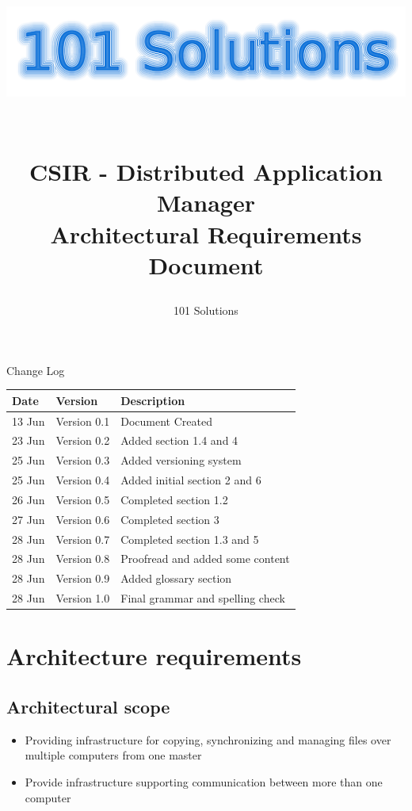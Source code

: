\documentclass[a4paper,12pt,final]{article}
\title{
\begin{center}
  	\includegraphics[scale=0.3]{101Logo.png} 
  \end{center}
  \textbf{\\}
CSIR - Distributed Application Manager\\
Architectural Requirements Document\\
}
\author{101 Solutions}
\begin{document}
\maketitle
\thispagestyle{empty}
\newpage
\tableofcontents
\thispagestyle{empty}
\newpage
Change Log
\vspace{6pt}\newline
\begin{tabular}{|l|l|l|}
\hline
Date & Version & Description\\
\hline
13 Jun & Version 0.1 & Document Created\\
\hline
23 Jun & Version 0.2 & Added section 1.4 and 4\\
\hline
25 Jun & Version 0.3 & Added versioning system\\
\hline
25 Jun & Version 0.4 & Added initial section 2 and 6\\
\hline
26 Jun & Version 0.5 & Completed section 1.2\\
\hline
27 Jun & Version 0.6 & Completed section 3\\
\hline
28 Jun & Version 0.7 & Completed section 1.3 and 5\\
\hline
28 Jun & Version 0.8 & Proofread and added some content\\
\hline
28 Jun & Version 0.9 & Added glossary section\\
\hline
28 Jun & Version 1.0 & Final grammar and spelling check\\
\hline
\end{tabular}

\section{Architecture requirements}
\subsection{Architectural scope}
\begin{itemize}
\item Providing infrastructure for copying, synchronizing and managing files over multiple computers from one master
\item Provide infrastructure supporting communication between more than one computer
\end{itemize}
\end{document}
